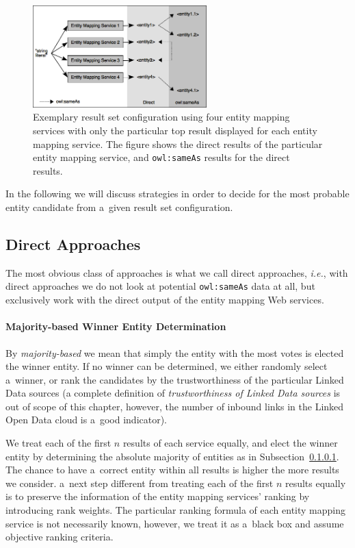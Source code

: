 \begin{figure}
 \centering
 \includegraphics[width=0.6\textwidth]{diagram.png}
 \caption{Exemplary result set configuration using four entity mapping services with only the particular top result displayed for each entity mapping service. The figure shows the direct results of the particular entity mapping service, and \texttt{owl:sameAs} results for the direct results.}
 \label{fig:diagram}
\end{figure}

In the following we will discuss strategies in order to decide for the most probable entity candidate from a~given
result set configuration.

\subsection{Direct Approaches}
The most obvious class of approaches is what we call direct approaches, \emph{i.e.}, with direct approaches we do not look at potential \texttt{owl:sameAs} data at all, but exclusively work with the direct output of the entity mapping Web services.

\paragraph{Majority-based Winner Entity Determination}\label{sec:direct}
By \textit{majority-based} we mean that simply the entity with the most votes is elected the winner entity. If no
winner can be determined, we either randomly select a~winner, or rank the candidates by the trustworthiness of the
particular Linked Data sources (a complete definition of \textit{trustworthiness of Linked Data sources} is out of
scope of this chapter, however, the number of inbound links in the Linked Open Data
cloud is a~good indicator).

We treat each of the first $n$ results of each service equally, and elect the winner entity by determining the
absolute majority of entities as in Subsection~\ref{sec:direct}. The chance to have a~correct entity within all results is
higher the more results we consider. a~next step different from treating each of the first $n$
results equally is to preserve the information of the entity mapping services' ranking by introducing rank
weights. The particular ranking formula of each entity mapping service is not necessarily known, however, we treat it as a~black box and assume objective ranking criteria.

